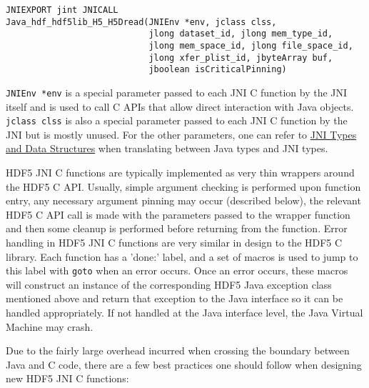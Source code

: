 \begin{verbatim}
JNIEXPORT jint JNICALL
Java_hdf_hdf5lib_H5_H5Dread(JNIEnv *env, jclass clss,
                            jlong dataset_id, jlong mem_type_id,
                            jlong mem_space_id, jlong file_space_id,
                            jlong xfer_plist_id, jbyteArray buf,
                            jboolean isCriticalPinning)
\end{verbatim}

\texttt{JNIEnv *env} is a special parameter passed to each JNI C function by the JNI itself and
is used to call C APIs that allow direct interaction with Java objects. \texttt{jclass clss} is
also a special parameter passed to each JNI C function by the JNI but is mostly unused. For the
other parameters, one can refer to \href{https://docs.oracle.com/en/java/javase/17/docs/specs/jni/types.html}{JNI Types and Data Structures}
when translating between Java types and JNI types.

HDF5 JNI C functions are typically implemented as very thin wrappers around the HDF5 C API. Usually,
simple argument checking is performed upon function entry, any necessary argument pinning may occur
(described below), the relevant HDF5 C API call is made with the parameters passed to the wrapper
function and then some cleanup is performed before returning from the function. Error handling in
HDF5 JNI C functions are very similar in design to the HDF5 C library. Each function has a 'done:'
label, and a set of macros is used to jump to this label with \texttt{goto} when an error occurs.
Once an error occurs, these macros will construct an instance of the corresponding HDF5 Java exception
class mentioned above and return that exception to the Java interface so it can be handled appropriately. If not handled at the Java interface level, the Java Virtual Machine may crash.

Due to the fairly large overhead incurred when crossing the boundary between Java and C code, there
are a few best practices one should follow when designing new HDF5 JNI C functions:

